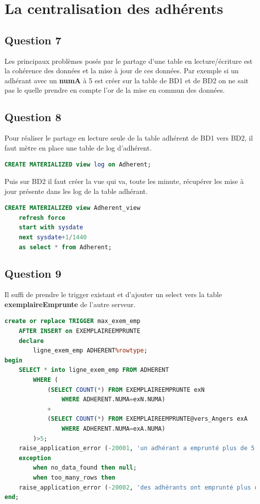 \documentclass{article}
\begin{document}
\section{La centralisation des adhérents}
\subsection{Question 7}
Les principaux problèmes posés par le partage d'une table en lecture/écriture est la cohérence des données et la mise à jour de ces données. Par exemple si un adhérant avec un \textbf{numA} à 5 est créer sur la table de BD1 et de BD2 on ne sait pas le quelle prendre en compte l'or de la mise en commun des données.

\subsection{Question 8}
Pour réaliser le partage en lecture seule de la table adhérent de BD1 vers BD2, il faut mètre en place une table de log d'adhérent.
\begin{lstlisting}[language=SQL, caption= Log d'adhérant sur BD1]
CREATE MATERIALIZED view log on Adherent;
\end{lstlisting}
Puis sur BD2 il faut créer la vue qui va, toute les minute, récupérer les mise à jour présente dans les log de la table adhérant.
\begin{lstlisting}[language=SQL, caption= View d'adhérant sur BD2]
CREATE MATERIALIZED view Adherent_view
    refresh force
    start with sysdate
    next sysdate+1/1440
    as select * from Adherent;
\end{lstlisting}

\subsection{Question 9}
Il suffi de prendre le trigger existant et d'ajouter un select vers la table \textbf{exemplaireEmprunte} de l'autre serveur.

\begin{lstlisting}[language=SQL, caption= Trigger max exemplaire emprunter version BD1]
create or replace TRIGGER max_exem_emp
    AFTER INSERT on EXEMPLAIREEMPRUNTE
    declare
        ligne_exem_emp ADHERENT%rowtype;
begin
    SELECT * into ligne_exem_emp FROM ADHERENT 
        WHERE (
            (SELECT COUNT(*) FROM EXEMPLAIREEMPRUNTE exN
                WHERE ADHERENT.NUMA=exN.NUMA)
            +
            (SELECT COUNT(*) FROM EXEMPLAIREEMPRUNTE@vers_Angers exA
                WHERE ADHERENT.NUMA=exA.NUMA)
        )>5;
    raise_application_error (-20001, 'un adhérant a emprunté plus de 5 exemplaires');
    exception
        when no_data_found then null;
        when too_many_rows then
    raise_application_error (-20002, 'des adhérants ont emprunté plus de 5 exemplaires');
end;
\end{lstlisting}
\end{document}
